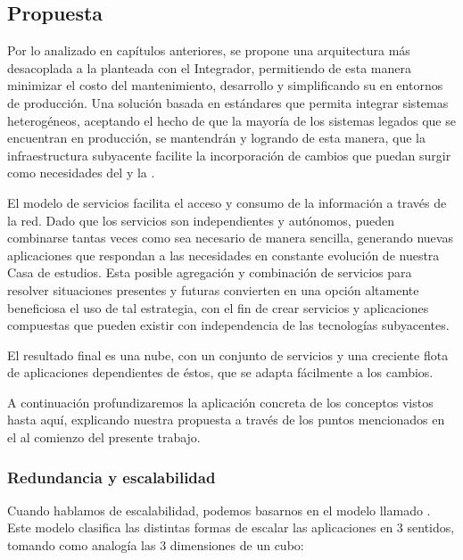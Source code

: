 \subsection{Propuesta}
\label{propuesta}

Por lo analizado en capítulos anteriores, se propone una arquitectura más desacoplada a la planteada con el Integrador, permitiendo de esta manera minimizar el costo del mantenimiento, desarrollo y simplificando su  en entornos de producción. Una solución basada en estándares que permita integrar sistemas heterogéneos, aceptando el hecho de que la mayoría de los sistemas legados que se encuentran en producción, se mantendrán y logrando de esta manera, que la infraestructura subyacente facilite la incorporación de cambios que puedan surgir como necesidades del {\cespi} y la {\unlp}.

El modelo de servicios facilita el acceso y consumo de la información a través de la red. Dado que los servicios son independientes y autónomos, pueden combinarse tantas veces como sea necesario de manera sencilla, generando nuevas aplicaciones que respondan a las necesidades en constante evolución de nuestra Casa de estudios. Esta posible agregación y combinación de servicios para resolver situaciones presentes y futuras convierten en una opción altamente beneficiosa el uso de tal estrategia, con el fin de crear servicios y aplicaciones compuestas que pueden existir con independencia de las tecnologías subyacentes\cite{microsoft2006}.

El resultado final es una nube, con un conjunto de servicios y una creciente flota de aplicaciones dependientes de éstos, que se adapta fácilmente a los cambios.

A continuación profundizaremos la aplicación concreta de los conceptos vistos hasta aquí, explicando nuestra propuesta a través de los puntos mencionados en el  al comienzo del presente trabajo.

\subsubsection{Redundancia y escalabilidad}
\label{propuesta:escalabilidad}

Cuando hablamos de escalabilidad, podemos basarnos en el modelo llamado \cite{website:akfpartners-scale-cube}. Este modelo clasifica las distintas formas de escalar las aplicaciones en 3 sentidos, tomando como analogía las 3 dimensiones de un cubo:

